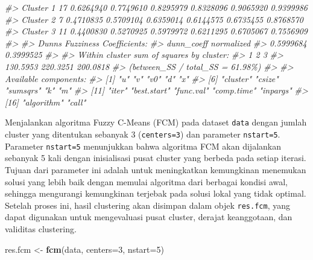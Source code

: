 \documentclass[
  oneside]{book}
\newenvironment{Shaded}{\begin{snugshade}}{\end{snugshade}}
\newcommand{\AttributeTok}[1]{\textcolor[rgb]{0.13,0.29,0.53}{#1}}
\newcommand{\CommentTok}[1]{\textcolor[rgb]{0.56,0.35,0.01}{\textit{#1}}}
\newcommand{\DecValTok}[1]{\textcolor[rgb]{0.00,0.00,0.81}{#1}}
\newcommand{\FunctionTok}[1]{\textcolor[rgb]{0.13,0.29,0.53}{\textbf{#1}}}
\newcommand{\NormalTok}[1]{#1}
\newcommand{\OtherTok}[1]{\textcolor[rgb]{0.56,0.35,0.01}{#1}}
\begin{document}
\begin{Shaded}
\begin{Highlighting}[]
\CommentTok{\#\textgreater{} Cluster 1   17 0.6264940 0.7749610 0.8295979 0.8328096 0.9065920 0.9399986}
\CommentTok{\#\textgreater{} Cluster 2    7 0.4710835 0.5709104 0.6359014 0.6144575 0.6735455 0.8768570}
\CommentTok{\#\textgreater{} Cluster 3   11 0.4400830 0.5270925 0.5979972 0.6211295 0.6705067 0.7556909}
\CommentTok{\#\textgreater{} }
\CommentTok{\#\textgreater{} Dunn\textquotesingle{}s Fuzziness Coefficients:}
\CommentTok{\#\textgreater{} dunn\_coeff normalized }
\CommentTok{\#\textgreater{}  0.5999684  0.3999525 }
\CommentTok{\#\textgreater{} }
\CommentTok{\#\textgreater{} Within cluster sum of squares by cluster:}
\CommentTok{\#\textgreater{}        1        2        3 }
\CommentTok{\#\textgreater{} 130.5953 220.3251 200.0818 }
\CommentTok{\#\textgreater{} (between\_SS / total\_SS =  61.98\%) }
\CommentTok{\#\textgreater{} }
\CommentTok{\#\textgreater{} Available components: }
\CommentTok{\#\textgreater{}  [1] "u"          "v"          "v0"         "d"          "x"         }
\CommentTok{\#\textgreater{}  [6] "cluster"    "csize"      "sumsqrs"    "k"          "m"         }
\CommentTok{\#\textgreater{} [11] "iter"       "best.start" "func.val"   "comp.time"  "inpargs"   }
\CommentTok{\#\textgreater{} [16] "algorithm"  "call"}
\end{Highlighting}
\end{Shaded}

Menjalankan algoritma Fuzzy C-Means (FCM) pada dataset \texttt{data} dengan jumlah cluster yang ditentukan sebanyak 3 (\texttt{centers=3}) dan parameter \texttt{nstart=5}. Parameter \texttt{nstart=5} menunjukkan bahwa algoritma FCM akan dijalankan sebanyak 5 kali dengan inisialisasi pusat cluster yang berbeda pada setiap iterasi. Tujuan dari parameter ini adalah untuk meningkatkan kemungkinan menemukan solusi yang lebih baik dengan memulai algoritma dari berbagai kondisi awal, sehingga mengurangi kemungkinan terjebak pada solusi lokal yang tidak optimal. Setelah proses ini, hasil clustering akan disimpan dalam objek \texttt{res.fcm}, yang dapat digunakan untuk mengevaluasi pusat cluster, derajat keanggotaan, dan validitas clustering.

\begin{Shaded}
\begin{Highlighting}[]
\NormalTok{res.fcm }\OtherTok{\textless{}{-}} \FunctionTok{fcm}\NormalTok{(data, }\AttributeTok{centers=}\DecValTok{3}\NormalTok{, }\AttributeTok{nstart=}\DecValTok{5}\NormalTok{)}
\end{Highlighting}
\end{Shaded}
\end{document}
